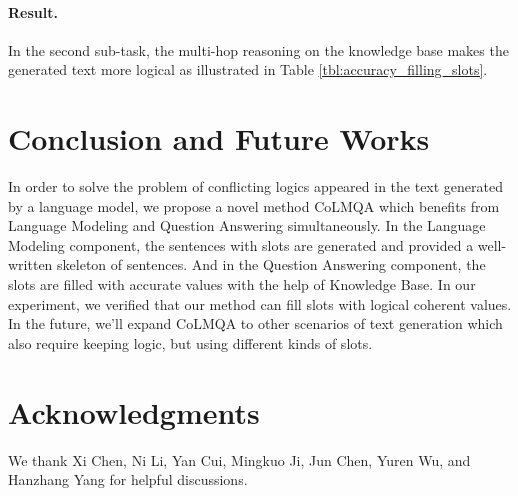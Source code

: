 \documentclass{article}
\begin{document}
\begin{table}[h]
\caption{The accuracy of filling slots.}
\label{tbl:accuracy_filling_slots}
\end{table}


\paragraph{Result.} 
In the second sub-task, the multi-hop reasoning on the knowledge base makes the generated text more logical as illustrated in Table \ref{tbl:accuracy_filling_slots}.

\section{Conclusion and Future Works}
In order to solve the problem of conflicting logics appeared in the text generated by a language model, we propose a novel method CoLMQA which benefits from Language Modeling and Question Answering simultaneously. 
In the Language Modeling component, the sentences with slots are generated and provided a well-written skeleton of sentences. And in the Question Answering component, the slots are filled with accurate values with the help of Knowledge Base. 
In our experiment, we verified that our method can fill slots with logical coherent values. 
In the future, we'll expand CoLMQA to other scenarios of text generation which also require keeping logic, but using different kinds of slots. 

\section*{Acknowledgments}
We thank Xi Chen, Ni Li, Yan Cui, Mingkuo Ji, Jun Chen, Yuren Wu, and Hanzhang Yang for helpful discussions.



\end{document}
